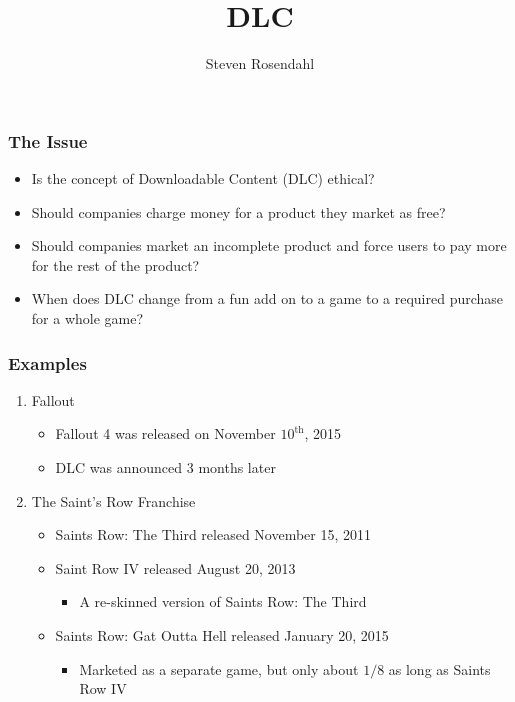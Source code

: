 \documentclass{beamer}
\title{DLC}
\author{Steven Rosendahl}
\date{}
\begin{document}
\frame{\titlepage}

\begin{frame}
\frametitle{The Issue}
\begin{itemize}
\item Is the concept of Downloadable Content (DLC) ethical?
\pause
\item Should companies charge money for a product they market as free?
\pause
\item Should companies market an incomplete product and force users to pay more for the rest of the product?
\pause
\item When does DLC change from a fun add on to a game to a required purchase for a whole game?
\end{itemize}
\end{frame}

\begin{frame}
\frametitle{Examples}
\begin{enumerate}
\item Fallout
\begin{itemize}
\pause
\item Fallout 4 was released on November $10^{\text{th}}$, 2015
\pause
\item DLC was announced 3 months later
\end{itemize}
\pause
\item The Saint's Row Franchise
\pause
\begin{itemize}
\item Saints Row: The Third released November 15, 2011
\pause
\item Saint Row IV released August 20, 2013
\begin{itemize}
\pause
\item A re-skinned version of Saints Row: The Third
\end{itemize}
\pause
\item Saints Row: Gat Outta Hell released January 20, 2015
\begin{itemize}
\pause
\item Marketed as a separate game, but only about $1/8$ as long as Saints Row IV
\end{itemize}
\end{itemize}
\pause
\begin{columns}[T]


\end{columns}
\end{enumerate}
\end{frame}
\end{document}
